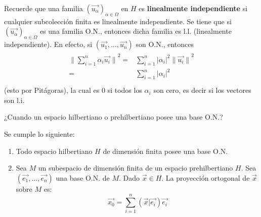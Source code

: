 \documentclass[12pt]{report}
\newcounter{it}
\theoremstyle{largebreak}
\newcommand\abs[1]{\ensuremath{\big|#1\big|}}
\newcommand\norm[1]{\ensuremath{\|#1\|}}
\newcommand\pint[2]{\ensuremath{\left(#1\big| #2\right)}}
\begin{document}
    Recuerde que una familia $\left(\vec{u_\alpha} \right)_{\alpha\in\Omega}$ en $H$ es \textbf{linealmente independiente} si cualquier subcolección finita es linealmente independiente. Se tiene que si $\left(\vec{u_\alpha} \right)_{\alpha\in\Omega}$ es una familia O.N., entonces dicha familia es l.l. (linealmente independiente). En efecto, si $(\vec{u_1},...,\vec{u_n})$ son O.N., entonces
    \begin{eqnarray}
        \begin{split}
            \norm{\sum_{i=1 }^{n}\alpha_i\vec{u_i}}^2=& \sum_{i=1 }^{n}\abs{\alpha_i}^2\norm{\vec{u_i}}^2 \\
            =& \sum_{i=1 }^{n}\abs{\alpha_i}^2 \\
        \end{split}
    \end{eqnarray}
    (esto por Pitágoras), la cual es 0 si todos los $\alpha_i$ son cero, es decir si los vectores son l.i.

    ¿Cuando un espacio hilbertiano o prehilbertiano posee una base O.N.?

    \begin{propo}
        Se cumple lo siguiente:
        \begin{enumerate}
            \item Todo espacio hilbertiano $H$ de dimensión finita posee una base O.N.
            \item Sea $M$ un subespacio de dimensión finita de un espacio prehilbertiano $H$. Sea $(\vec{e_1},...,\vec{e_n})$ una base O.N. de $M$. Dado $\vec{x}\in H$. La proyección ortogonal de $\vec{x}$ sobre $M$ es:
            \begin{equation*}
                \vec{x_0}=\sum_{ i=1}^{n}\pint{\vec{x}}{\vec{e_i}}\vec{e_i}
            \end{equation*}
        \end{enumerate}
    \end{propo}
\end{document}
